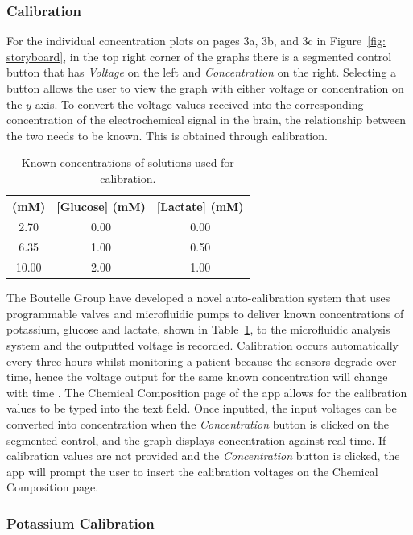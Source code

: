 \subsubsection{Calibration}
For the individual concentration plots on pages 3a, 3b, and 3c in Figure~\ref{fig: storyboard}, in the top right corner of the graphs there is a segmented control button that has \textit{Voltage} on the left and \textit{Concentration} on the right. Selecting a button allows the user to view the graph with either voltage or concentration on the $y$-axis. To convert the voltage values received into the corresponding concentration of the electrochemical signal in the brain, the relationship between the two needs to be known. This is obtained through calibration. 

\begin{table}[h!]
\centering
\begin{tabular}{||c c c||} 
 \hline
 [K+] (mM) & [Glucose] (mM) & [Lactate] (mM) \\ [0.5ex] 
 \hline\hline
 2.70 & 0.00 & 0.00 \\
 6.35 & 1.00 & 0.50 \\
 10.00 & 2.00 & 1.00 \\
 \hline
\end{tabular}
\caption{Known concentrations of solutions used for calibration.}
\label{table: calibration conc}
\end{table}

The Boutelle Group have developed a novel auto-calibration system that uses programmable valves and microfluidic pumps to deliver known concentrations of potassium, glucose and lactate, shown in Table~\ref{table: calibration conc}, to the microfluidic analysis system and the outputted voltage is recorded. Calibration occurs automatically every three hours whilst monitoring a patient because the sensors degrade over time, hence the voltage output for the same known concentration will change with time \cite{Rogers2017}. The Chemical Composition page of the app allows for the calibration values to be typed into the text field. Once inputted, the input voltages can be converted into concentration when the \textit{Concentration} button is clicked on the segmented control, and the graph displays concentration against real time. If calibration values are not provided and the \textit{Concentration} button is clicked, the app will prompt the user to insert the calibration voltages on the Chemical Composition page. 

\subsubsection{Potassium Calibration}

